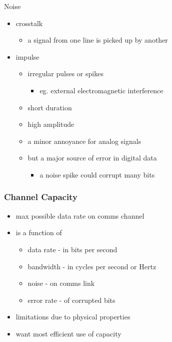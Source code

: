 \documentclass[pdflatex,compress]{beamer}
\begin{document}
\begin{frame}{Noise}
	\begin{itemize}
		\item crosstalk
		\begin{itemize}
			\item a signal from one line is picked up by another
		\end{itemize}
		\item impulse
		\begin{itemize}
			\item irregular pulses or spikes
			\begin{itemize}
				\item eg. external electromagnetic interference
			\end{itemize}
			\item short duration
			\item high amplitude
			\item a minor annoyance for analog signals
			\item but a major source of error in digital data
			\begin{itemize}
				\item a noise spike could corrupt many bits
			\end{itemize}
		\end{itemize}
	\end{itemize}
\end{frame}

\begin{frame}
	\frametitle{Channel Capacity}
	\begin{itemize}
		\item max possible data rate on comms channel 
		\item is a function of
		\begin{itemize}
			\item data rate - in bits per second
			\item bandwidth - in cycles per second or Hertz
			\item noise - on comms link
			\item error rate - of corrupted bits
		\end{itemize}
		\item limitations due to physical properties
		\item want most efficient use of capacity
	\end{itemize}
\end{frame}
\end{document}
